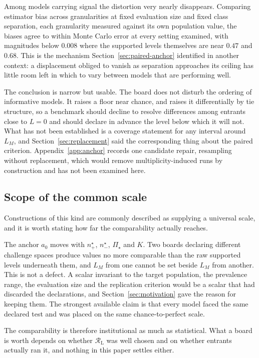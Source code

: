 \documentclass[11pt]{article}
\newcommand{\Regime}{\mathcal{R}}
\newcommand{\PSet}{\Pi_\star}
\newcommand{\RegimeL}{\Regime_{\mathrm{L}}}
\theoremstyle{remark}
\begin{document}
Among models carrying signal the distortion very nearly disappears. Comparing estimator bias across granularities at fixed evaluation size and fixed class separation, each granularity measured against its own population value, the biases agree to within Monte Carlo error at every setting examined, with magnitudes below $0.008$ where the supported levels themselves are near $0.47$ and $0.68$. This is the mechanism Section~\ref{sec:paired-anchor} identified in another context: a displacement obliged to vanish as separation approaches its ceiling has little room left in which to vary between models that are performing well.

The conclusion is narrow but usable. The board does not disturb the ordering of informative models. It raises a floor near chance, and raises it differentially by tie structure, so a benchmark should decline to resolve differences among entrants close to $L=0$ and should declare in advance the level below which it will not. What has not been established is a coverage statement for any interval around $L_M$, and Section~\ref{sec:replacement} said the corresponding thing about the paired criterion. Appendix~\ref{app:anchor} records one candidate repair, resampling without replacement, which would remove multiplicity-induced runs by construction and has not been examined here.

\subsection{Scope of the common scale}
\label{sec:what-universal-means}

Constructions of this kind are commonly described as supplying a universal scale, and it is worth stating how far the comparability actually reaches.

The anchor $a_0$ moves with $n^\star_+$, $n^\star_-$, $\PSet$ and $K$. Two boards declaring different challenge spaces produce values no more comparable than the raw supported levels underneath them, and $L_M$ from one cannot be set beside $L_M$ from another. This is not a defect. A scalar invariant to the target population, the prevalence range, the evaluation size and the replication criterion would be a scalar that had discarded the declarations, and Section~\ref{sec:motivation} gave the reason for keeping them. The strongest available claim is that every model faced the same declared test and was placed on the same chance-to-perfect scale.

The comparability is therefore institutional as much as statistical. What a board is worth depends on whether $\RegimeL$ was well chosen and on whether entrants actually ran it, and nothing in this paper settles either.
\end{document}
